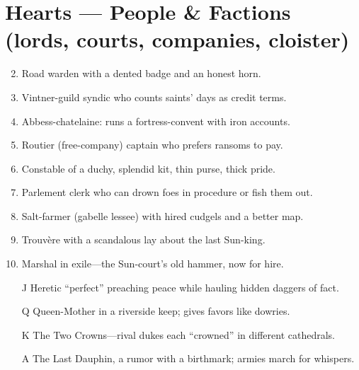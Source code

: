 \section*{Hearts --- People \& Factions (lords, courts, companies, cloister)}
\begin{enumerate}
\setcounter{enumi}{1}
\item Road warden with a dented badge and an honest horn.
\item Vintner-guild syndic who counts saints' days as credit terms.
\item Abbess-chatelaine: runs a fortress-convent with iron accounts.
\item Routier (free-company) captain who prefers ransoms to pay.
\item Constable of a duchy, splendid kit, thin purse, thick pride.
\item Parlement clerk who can drown foes in procedure or fish them out.
\item Salt-farmer (gabelle lessee) with hired cudgels and a better map.
\item Trouvère with a scandalous lay about the last Sun-king.
\item Marshal in exile---the Sun-court's old hammer, now for hire.
\item[J] Heretic ``perfect'' preaching peace while hauling hidden daggers of fact.
\item[Q] Queen-Mother in a riverside keep; gives favors like dowries.
\item[K] The Two Crowns---rival dukes each ``crowned'' in different cathedrals.
\item[A] The Last Dauphin, a rumor with a birthmark; armies march for whispers.
\end{enumerate}

